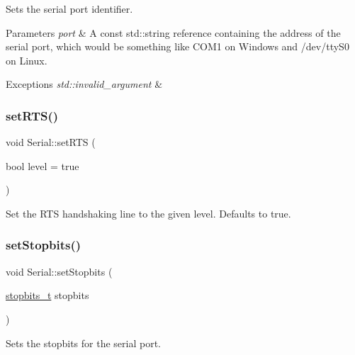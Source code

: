 Sets the serial port identifier.


\begin{DoxyParams}{Parameters}
{\em port} & A const std\+::string reference containing the address of the serial port, which would be something like \textquotesingle{}C\+O\+M1\textquotesingle{} on Windows and \textquotesingle{}/dev/tty\+S0\textquotesingle{} on Linux.\\
\hline
\end{DoxyParams}

\begin{DoxyExceptions}{Exceptions}
{\em std\+::invalid\+\_\+argument} & \\
\hline
\end{DoxyExceptions}
\mbox{\label{classserial_1_1_serial_ab43ddc05e5d69ff2778f698aa7062370}} 
\subsubsection{\texorpdfstring{set\+R\+T\+S()}{setRTS()}}
{\footnotesize\ttfamily void Serial\+::set\+R\+TS (\begin{DoxyParamCaption}\item[{bool}]{level = {\ttfamily true} }\end{DoxyParamCaption})}

Set the R\+TS handshaking line to the given level. Defaults to true. \mbox{\label{classserial_1_1_serial_ab72284b5aab723b81013fb560bd6acc5}} 
\subsubsection{\texorpdfstring{set\+Stopbits()}{setStopbits()}}
{\footnotesize\ttfamily void Serial\+::set\+Stopbits (\begin{DoxyParamCaption}\item[{\mbox{\hyperlink{namespaceserial_af5b116611d6628a3aa8f788fdc09f469}{stopbits\+\_\+t}}}]{stopbits }\end{DoxyParamCaption})}

Sets the stopbits for the serial port.



